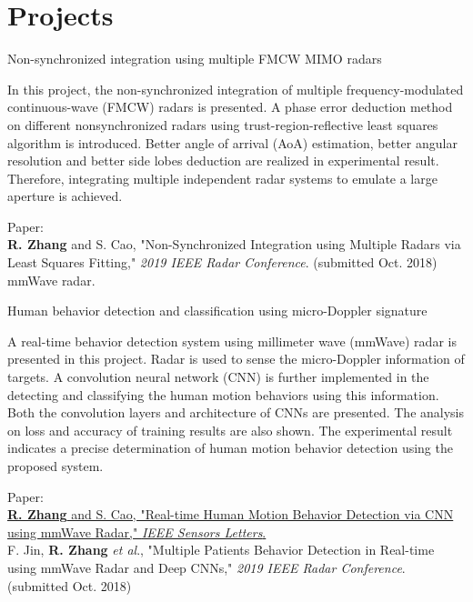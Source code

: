 \documentclass[letterpaper,9pt]{article}
\newcommand{\etal}{\textit{et al}.}
\renewenvironment{itemize}{
  \begin{list}{}{
    \setlength{\topsep}{0pt}
    \setlength{\itemsep}{0pt}
    \setlength{\parsep}{0pt}
    \setlength{\partopsep}{0pt}
    \setlength{\leftmargin}{1.5em}
  }
}{\end{list}}
\begin{document}
\section*{Projects}
\begin{itemize}
  \setlength{\itemsep}{1em}
  \item Non-synchronized integration using multiple FMCW MIMO radars
  \begin{itemize}
    \item [$\bullet$] In this project, the non-synchronized integration of multiple frequency-modulated continuous-wave (FMCW) radars is presented. A phase error deduction method on different nonsynchronized radars using trust-region-reflective least squares algorithm is introduced. Better angle of arrival (AoA) estimation,
    better angular resolution and better side lobes deduction are realized in experimental result. Therefore, integrating multiple independent radar systems to emulate a large aperture is achieved.
    \item [$\bullet$] Paper: \\
    {\bf R. Zhang} and S. Cao, "Non-Synchronized Integration using Multiple Radars via Least Squares Fitting," {\it 2019 IEEE Radar Conference}. (submitted Oct. 2018)
  mmWave radar.
  \end{itemize}

  \item Human behavior detection and classification using micro-Doppler signature
  \begin{itemize}
    \item [$\bullet$] A real-time behavior detection system using millimeter wave (mmWave) radar is presented in this project. Radar is used to sense the micro-Doppler information of targets. A convolution neural network (CNN) is further implemented in the detecting and classifying the human motion behaviors using this information. Both the convolution layers and architecture of CNNs are presented. The analysis on loss and accuracy of training results are also shown. The experimental result indicates a precise determination of human motion behavior detection using the proposed system.
    \item [$\bullet$] Paper: \\
    \href{https://ieeexplore.ieee.org/document/8585077}{{\bf R. Zhang} and S. Cao, "Real-time Human Motion Behavior Detection via CNN using mmWave Radar," {\it IEEE Sensors Letters}.}\\
    F. Jin, {\bf R. Zhang} \etal, "Multiple Patients Behavior Detection in Real-time using mmWave Radar and Deep CNNs," {\it 2019 IEEE Radar Conference}. (submitted Oct. 2018)
  \end{itemize}


\end{itemize}
\end{document}

